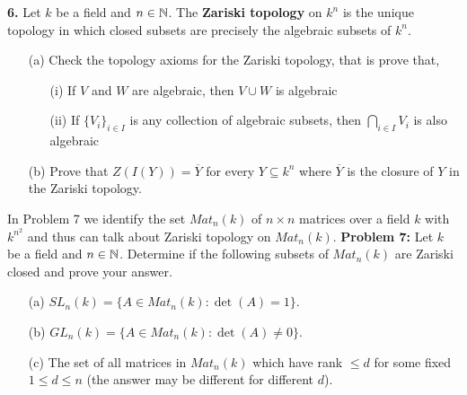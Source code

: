 \documentclass[12pt]{amsart}
\begin{document}
\skv
{\bf 6.} Let $k$ be a field and $n\in{\mathbb N}$. The {\bf Zariski topology} on $k^n$ is the unique topology in which closed subsets
are precisely the algebraic subsets of $k^n$.
\begin{itemize}
\item[(a)] Check the topology axioms for the Zariski topology, that is prove that,
\begin{itemize}
\item[(i)] If $V$ and $W$ are algebraic, then $V\cup W$ is algebraic
\item[(ii)] If $\{V_i\}_{i\in I}$ is any collection of algebraic subsets, then $\bigcap_{i\in I} V_i$ is also algebraic
\end{itemize}
\item[(b)] Prove that $Z(I(Y))=\overline Y$ for every $Y\subseteq k^n$ where $\overline Y$ is the closure of $Y$ in the Zariski topology.
\end{itemize}
\skv

In Problem 7 we identify the set $Mat_n(k)$ of $n\times n$ matrices over a field $k$
with $k^{n^2}$ and thus can talk about Zariski topology on $Mat_n(k)$.
\skv
{\bf Problem 7:} Let $k$ be a field and $n\in{\mathbb N}$. Determine if the following subsets of $Mat_n(k)$ are Zariski closed
 and prove your answer.
\begin{itemize}
\item[(a)] $SL_n(k)=\{A\in Mat_n(k): \det(A)=1\}$.
\item[(b)] $GL_n(k)=\{A\in Mat_n(k): \det(A)\neq 0\}$.
\item[(c)] The set of all matrices in $Mat_n(k)$ which have rank $\leq d$ for some fixed $1\leq d\leq n$ (the answer may be different for different $d$).
\end{itemize}
\end{document}
